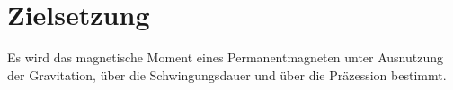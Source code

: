\section{Zielsetzung}
\label{sec:Zielsetzung}

Es wird das magnetische Moment eines Permanentmagneten unter Ausnutzung der Gravitation, über die Schwingungsdauer
und über die Präzession bestimmt.